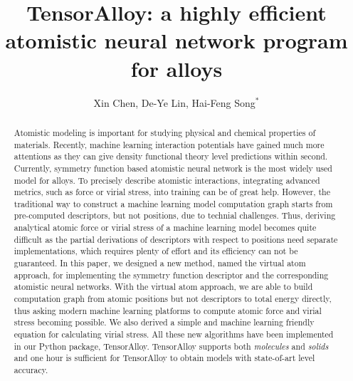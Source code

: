 \documentclass[prb,preprint]{revtex4-2}
\begin{document}
\title{
    TensorAlloy: a highly efficient atomistic neural network program for alloys
}
\author{Xin Chen, De-Ye Lin, Hai-Feng Song$^\mathrm{*}$}



\begin{abstract}
Atomistic modeling is important for studying physical and chemical properties of
materials. Recently, machine learning interaction potentials have gained much 
more attentions as they can give density functional theory level predictions 
within second. Currently, symmetry function based atomistic neural network is 
the most widely used model for alloys. To precisely describe atomistic 
interactions, integrating advanced metrics, such as force or virial stress, into 
training can be of great help. However, the traditional way to construct a 
machine learning model computation graph starts from pre-computed descriptors, 
but not positions, due to technial challenges. Thus, deriving analytical atomic 
force or virial stress of a machine learning model becomes quite difficult as 
the partial derivations of descriptors with respect to positions need separate 
implementations, which requires plenty of effort and its efficiency can not be 
guaranteed.
In this paper, we designed a new method, named the virtual atom approach, for 
implementing the symmetry function descriptor and the corresponding atomistic 
neural networks. With the virtual atom approach, we are able to build 
computation graph from atomic positions \textemdash but not descriptors 
\textemdash to total energy directly, thus asking modern machine learning 
platforms to compute atomic force and virial stress becoming possible. We also 
derived a simple and machine learning friendly equation for calculating virial 
stress. All these new algorithms have been implemented in our Python package, 
TensorAlloy. TensorAlloy supports both \textit{molecules} and \textit{solids} 
and one hour is sufficient for TensorAlloy to obtain models with state-of-art 
level accuracy.
\end{abstract}

\maketitle

\newcommand{\tensoralloy}{\textbf{TensorAlloy}}
\end{document}
